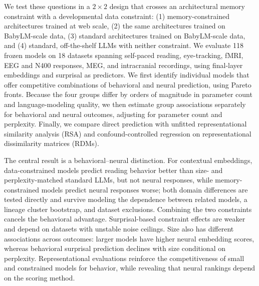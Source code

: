 We test these questions in a $2\times2$ design that crosses an architectural memory constraint with a developmental data constraint: (1) memory-constrained architectures trained at web scale, (2) the same architectures trained on BabyLM-scale data, (3) standard architectures trained on BabyLM-scale data, and (4) standard, off-the-shelf LLMs with neither constraint. We evaluate 118 frozen models on 18 datasets spanning self-paced reading, eye-tracking, fMRI, EEG and N400 responses, MEG, and intracranial recordings, using final-layer embeddings and surprisal as predictors. We first identify individual models that offer competitive combinations of behavioral and neural prediction, using Pareto fronts. Because the four groups differ by orders of magnitude in parameter count and language-modeling quality, we then estimate group associations separately for behavioral and neural outcomes, adjusting for parameter count and perplexity. Finally, we compare direct prediction with unfitted representational similarity analysis (RSA) and confound-controlled regression on representational dissimilarity matrices (RDMs).

The central result is a behavioral--neural distinction. For contextual embeddings, data-constrained models predict reading behavior better than size- and perplexity-matched standard LLMs, but not neural responses, while memory-constrained models predict neural responses worse; both domain differences are tested directly and survive modeling the dependence between related models, a lineage cluster bootstrap, and dataset exclusions. Combining the two constraints cancels the behavioral advantage. Surprisal-based constraint effects are weaker and depend on datasets with unstable noise ceilings. Size also has different associations across outcomes: larger models have higher neural embedding scores, whereas behavioral surprisal prediction declines with size conditional on perplexity. Representational evaluations reinforce the competitiveness of small and constrained models for behavior, while revealing that neural rankings depend on the scoring method.

